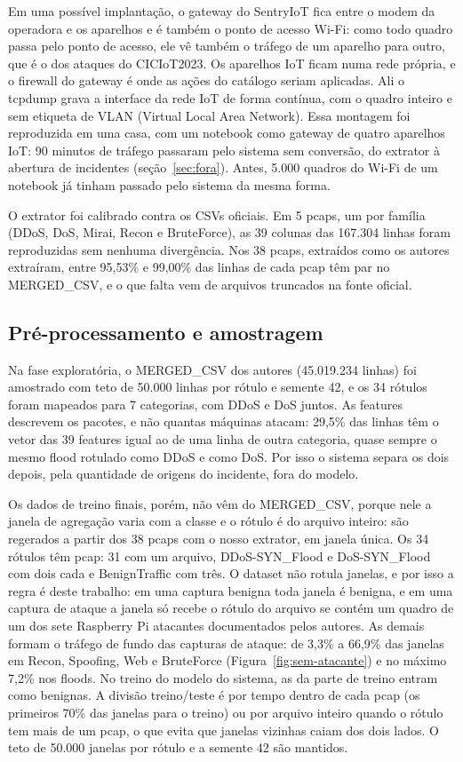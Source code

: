 Em uma possível implantação, o gateway do SentryIoT fica entre o modem da operadora e os aparelhos e é também o ponto de acesso Wi-Fi: como todo quadro passa pelo ponto de acesso, ele vê também o tráfego de um aparelho para outro, que é o dos ataques do CICIoT2023. Os aparelhos IoT ficam numa rede própria, e o firewall do gateway é onde as ações do catálogo seriam aplicadas. Ali o tcpdump grava a interface da rede IoT de forma contínua, com o quadro inteiro e sem etiqueta de VLAN (Virtual Local Area Network). Essa montagem foi reproduzida em uma casa, com um notebook como gateway de quatro aparelhos IoT: 90 minutos de tráfego passaram pelo sistema sem conversão, do extrator à abertura de incidentes (seção~\ref{sec:fora}). Antes, 5.000 quadros do Wi-Fi de um notebook já tinham passado pelo sistema da mesma forma.

O extrator foi calibrado contra os CSVs oficiais. Em 5 pcaps, um por família (DDoS, DoS, Mirai, Recon e BruteForce), as 39 colunas das 167.304 linhas foram reproduzidas sem nenhuma divergência. Nos 38 pcaps, extraídos como os autores extraíram, entre 95,53\% e 99,00\% das linhas de cada pcap têm par no MERGED\_CSV, e o que falta vem de arquivos truncados na fonte oficial.

\subsection{Pré-processamento e amostragem}
\label{sec:preprocessamento}

Na fase exploratória, o MERGED\_CSV dos autores (45.019.234 linhas) foi amostrado com teto de 50.000 linhas por rótulo e semente 42, e os 34 rótulos foram mapeados para 7 categorias, com DDoS e DoS juntos. As features descrevem os pacotes, e não quantas máquinas atacam: 29,5\% das linhas têm o vetor das 39 features igual ao de uma linha de outra categoria, quase sempre o mesmo flood rotulado como DDoS e como DoS. Por isso o sistema separa os dois depois, pela quantidade de origens do incidente, fora do modelo.

Os dados de treino finais, porém, não vêm do MERGED\_CSV, porque nele a janela de agregação varia com a classe e o rótulo é do arquivo inteiro: são regerados a partir dos 38 pcaps com o nosso extrator, em janela única. Os 34 rótulos têm pcap: 31 com um arquivo, DDoS-SYN\_Flood e DoS-SYN\_Flood com dois cada e BenignTraffic com três. O dataset não rotula janelas, e por isso a regra é deste trabalho: em uma captura benigna toda janela é benigna, e em uma captura de ataque a janela só recebe o rótulo do arquivo se contém um quadro de um dos sete Raspberry Pi atacantes documentados pelos autores. As demais formam o tráfego de fundo das capturas de ataque: de 3,3\% a 66,9\% das janelas em Recon, Spoofing, Web e BruteForce (Figura~\ref{fig:sem-atacante}) e no máximo 7,2\% nos floods. No treino do modelo do sistema, as da parte de treino entram como benignas. A divisão treino/teste é por tempo dentro de cada pcap (os primeiros 70\% das janelas para o treino) ou por arquivo inteiro quando o rótulo tem mais de um pcap, o que evita que janelas vizinhas caiam dos dois lados. O teto de 50.000 janelas por rótulo e a semente 42 são mantidos.

